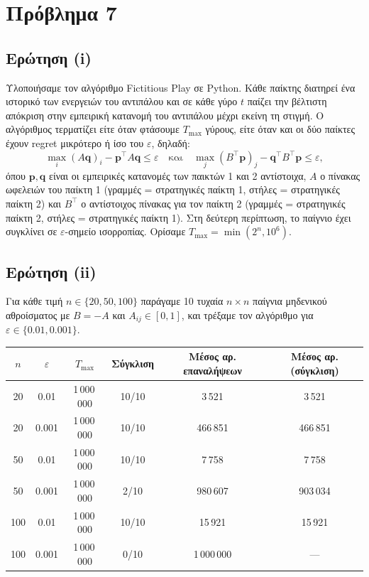 \section{Πρόβλημα 7}

\subsection{Ερώτηση (i)}

Υλοποιήσαμε τον αλγόριθμο Fictitious Play σε Python. Κάθε παίκτης διατηρεί ένα
ιστορικό των ενεργειών του αντιπάλου και σε κάθε γύρο $t$ παίζει την βέλτιστη
απόκριση στην εμπειρική κατανομή του αντιπάλου μέχρι εκείνη τη στιγμή. Ο
αλγόριθμος τερματίζει είτε όταν φτάσουμε $T_{\max}$ γύρους, είτε όταν και οι δύο
παίκτες έχουν regret μικρότερο ή ίσο του $\varepsilon$, δηλαδή:
$$
\max_i (A\mathbf{q})_i - \mathbf{p}^\top A \mathbf{q} \leq \varepsilon
\quad \text{και} \quad
\max_j (B^\top \mathbf{p})_j - \mathbf{q}^\top B^\top \mathbf{p} \leq \varepsilon,
$$
όπου $\mathbf{p}, \mathbf{q}$ είναι οι εμπειρικές κατανομές των παικτών 1 και 2
αντίστοιχα, $A$ ο πίνακας ωφελειών του παίκτη 1 (γραμμές = στρατηγικές παίκτη 1,
στήλες = στρατηγικές παίκτη 2) και $B^\top$ ο αντίστοιχος πίνακας για τον παίκτη
2 (γραμμές = στρατηγικές παίκτη 2, στήλες = στρατηγικές παίκτη 1). Στη δεύτερη
περίπτωση, το παίγνιο έχει συγκλίνει σε $\varepsilon$-σημείο ισορροπίας.
Ορίσαμε $T_{\max} = \min(2^n, 10^6)$.

\subsection{Ερώτηση (ii)}

Για κάθε τιμή $n \in \{20, 50, 100\}$ παράγαμε 10 τυχαία $n \times n$ παίγνια
μηδενικού αθροίσματος με $B = -A$ και $A_{ij} \in [0,1]$, και τρέξαμε τον
αλγόριθμο για $\varepsilon \in \{0.01, 0.001\}$.

\begin{center}
\begin{tabular}{cccccc}
    $n$ & $\varepsilon$ & $T_{\max}$ & Σύγκλιση & Μέσος αρ. επαναλήψεων & Μέσος αρ. (σύγκλιση) \\
    \hline
    20  & 0.01  & 1\,000\,000 & 10/10 & 3\,521  & 3\,521   \\
    20  & 0.001 & 1\,000\,000 & 10/10 & 466\,851 & 466\,851 \\
    50  & 0.01  & 1\,000\,000 & 10/10 & 7\,758  & 7\,758   \\
    50  & 0.001 & 1\,000\,000 & 2/10  & 980\,607 & 903\,034 \\
    100 & 0.01  & 1\,000\,000 & 10/10 & 15\,921 & 15\,921  \\
    100 & 0.001 & 1\,000\,000 & 0/10  & 1\,000\,000 & --- \\
\end{tabular}
\end{center}

